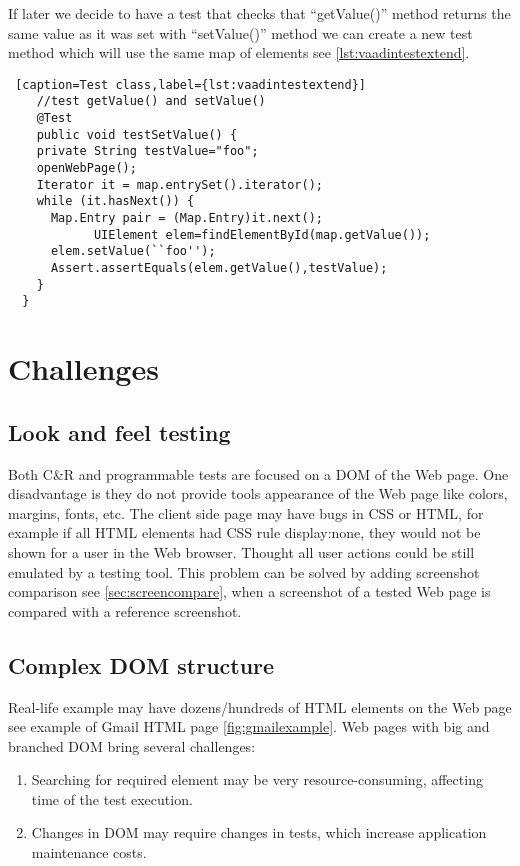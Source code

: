       If later we decide to have a test that checks that ``getValue()'' method
      returns the same value as it was set with ``setValue()'' method we can create
      a new test method which will use the same map of elements see
      \ref{lst:vaadintestextend}.

\lstset{style=a1listing}      
\begin{lstlisting} [caption=Test class,label={lst:vaadintestextend}]
	//test getValue() and setValue()
	@Test
	public void testSetValue() {
    private String testValue="foo";
    openWebPage();
  	Iterator it = map.entrySet().iterator();
    while (it.hasNext()) {
      Map.Entry pair = (Map.Entry)it.next();
			UIElement elem=findElementById(map.getValue());
      elem.setValue(``foo'');  
      Assert.assertEquals(elem.getValue(),testValue);        
    }
  }
\end{lstlisting}

 
\section {Challenges}
	\label {sec:challenges}
	\subsection{Look and feel testing}
	    Both C\&R and programmable tests are focused on a DOM of the Web page.
	    One disadvantage is they do not provide tools appearance of the Web page
	    like colors, margins, fonts, etc. The client side page may have bugs in CSS
	    or HTML, for example if all HTML elements had CSS rule display:none, they
	    would not be shown for a user in the Web browser. Thought all user actions
	    could be still emulated by a testing tool. This problem can be solved by adding screenshot
      comparison see \ref{sec:screencompare}, when a screenshot of a tested Web
      page is compared with a reference screenshot. 
	\subsection{Complex DOM structure}
    Real-life example may have dozens/hundreds of HTML
		elements on the Web page see example of Gmail HTML page
		\ref{fig:gmailexample}.
		Web pages with big and branched DOM bring several challenges:
		\begin{enumerate}
		  \item Searching for required element may be very resource-consuming,
		  affecting time of the test execution. 
		  \item Changes in DOM may require changes in tests, which increase
		  application maintenance costs.
		\end{enumerate}
		
